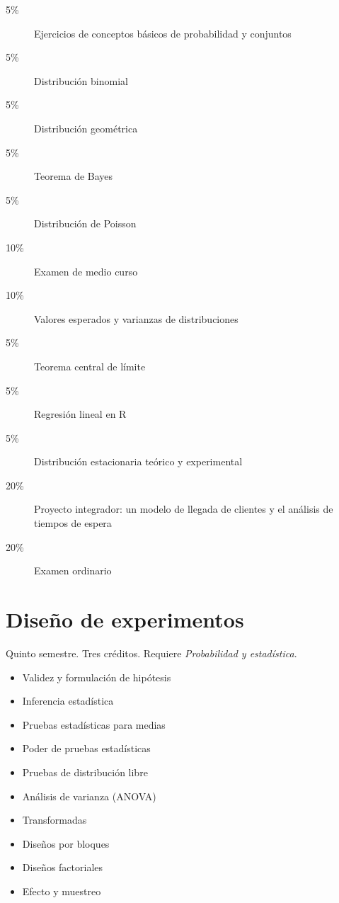 \documentclass{article}
\begin{document}
\begin{multicols}{4}
\begin{description}
\item[5\%]{Ejercicios de conceptos b\'{a}sicos de probabilidad y
  conjuntos}
\item[5\%]{Distribuci\'{o}n binomial}
\item[5\%]{Distribuci\'{o}n geom\'{e}trica}  
\item[5\%]{Teorema de Bayes}
\item[5\%]{Distribuci\'{o}n de Poisson}
\item[10\%]{Examen de medio curso}
\item[10\%]{Valores esperados y varianzas de distribuciones}
\item[5\%]{Teorema central de l\'{i}mite}
\item[5\%]{Regresi\'{o}n lineal en R}
\item[5\%]{Distribuci\'{o}n estacionaria te\'{o}rico y experimental}
\item[20\%]{Proyecto integrador: un modelo de llegada de clientes y el
  an\'{a}lisis de tiempos de espera}
\item[20\%]{Examen ordinario}    
\end{description}

\vfill\null \columnbreak

\hypertarget{dde}{\section*{Dise\~{n}o de experimentos}}

Quinto semestre. Tres cr\'{e}ditos. Requiere {\em Probabilidad y
  estad\'{i}stica}.

\begin{itemize}
\item{Validez y formulaci\'{o}n de hip\'{o}tesis}
\item{Inferencia estad\'{i}stica}
\item{Pruebas estad\'{i}sticas para medias}
\item{Poder de pruebas estad\'{i}sticas}
\item{Pruebas de distribuci\'{o}n libre}
\item{An\'{a}lisis de varianza (ANOVA)}
\item{Transformadas}
\item{Dise\~{n}os por bloques}
\item{Dise\~{n}os factoriales}
\item{Efecto y muestreo}
\end{itemize}


\end{multicols}
\end{document}
